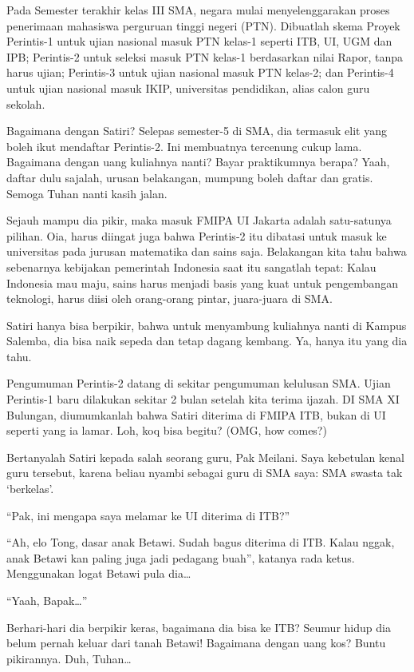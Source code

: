 Pada Semester terakhir kelas III SMA, negara mulai menyelenggarakan proses penerimaan mahasiswa perguruan tinggi negeri (PTN). Dibuatlah skema Proyek Perintis-1 untuk ujian nasional masuk PTN kelas-1 seperti ITB, UI, UGM dan IPB; Perintis-2 untuk seleksi masuk PTN kelas-1 berdasarkan nilai Rapor, tanpa harus ujian; Perintis-3 untuk ujian nasional masuk PTN kelas-2; dan Perintis-4 untuk ujian nasional masuk IKIP, universitas pendidikan, alias calon guru sekolah.

Bagaimana dengan Satiri? Selepas semester-5 di SMA, dia termasuk elit yang boleh ikut mendaftar Perintis-2. Ini membuatnya tercenung cukup lama. Bagaimana dengan uang kuliahnya nanti? Bayar praktikumnya berapa? Yaah, daftar dulu sajalah, urusan belakangan, mumpung boleh daftar dan gratis. Semoga Tuhan nanti kasih jalan.

Sejauh mampu dia pikir, maka masuk FMIPA UI Jakarta adalah satu-satunya pilihan. Oia, harus diingat juga bahwa Perintis-2 itu dibatasi untuk masuk ke universitas pada jurusan matematika dan sains saja. Belakangan kita tahu bahwa sebenarnya kebijakan pemerintah Indonesia saat itu sangatlah tepat: Kalau Indonesia mau maju, sains harus menjadi basis yang kuat untuk pengembangan teknologi, harus diisi oleh orang-orang pintar, juara-juara di SMA.

Satiri hanya bisa berpikir, bahwa untuk menyambung kuliahnya nanti di Kampus Salemba, dia bisa naik sepeda dan tetap dagang kembang. Ya, hanya itu yang dia tahu.

Pengumuman Perintis-2 datang di sekitar pengumuman kelulusan SMA. Ujian Perintis-1 baru dilakukan sekitar 2 bulan setelah kita terima ijazah. DI SMA XI Bulungan, diumumkanlah bahwa Satiri diterima di FMIPA ITB, bukan di UI seperti yang ia lamar. Loh, koq bisa begitu? (OMG, how comes?)

Bertanyalah Satiri kepada salah seorang guru, Pak Meilani. Saya kebetulan kenal guru tersebut, karena beliau nyambi sebagai guru di SMA saya: SMA swasta tak ‘berkelas’.

“Pak, ini mengapa saya melamar ke UI diterima di ITB?”

“Ah, elo Tong, dasar anak Betawi. Sudah bagus diterima di ITB. Kalau nggak, anak Betawi kan paling juga jadi pedagang buah”, katanya rada ketus. Menggunakan logat Betawi pula dia…

“Yaah, Bapak…”

Berhari-hari dia berpikir keras, bagaimana dia bisa ke ITB? Seumur hidup dia belum pernah keluar dari tanah Betawi! Bagaimana dengan uang kos? Buntu pikirannya. Duh, Tuhan…


